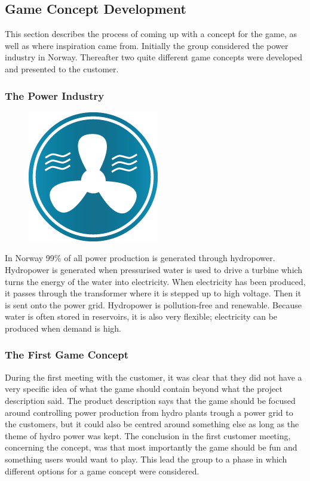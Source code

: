 \subsection{Game Concept Development}

This section describes the process of coming up with a concept for the game, as well as where inspiration came from. Initially the group considered the power industry in Norway. Thereafter two quite different game concepts were developed and presented to the customer.

\subsubsection{The Power Industry}

\begin{figure}
  \begin{center}
  \includegraphics[scale=0.5]{pictures/water_generator.png}
  \end{center}
\end{figure}

In Norway 99\% of all power production is generated through hydropower. Hydropower is generated when pressurised water is used to drive a turbine which turns the energy of the water into electricity. When electricity has been produced, it passes through the transformer where it is stepped up to high voltage. Then it is sent onto the power grid. Hydropower is pollution-free and renewable. Because water is often stored in reservoirs, it is also very flexible; electricity can be produced when demand is high. \cite{statkraftVannkraft}

\subsubsection{The First Game Concept}

During the first meeting with the customer, it was clear that they did not have a very specific idea of what the game should contain beyond what the project description said. The product description says that the game should be focused around controlling power production from hydro plants trough a power grid to the customers, but it could also be centred around something else as long as the theme of hydro power was kept. The conclusion in the first customer meeting, concerning the concept, was that most importantly the game should be fun and something users would want to play. This
lead the group to a phase in which different options for a game concept were considered.

